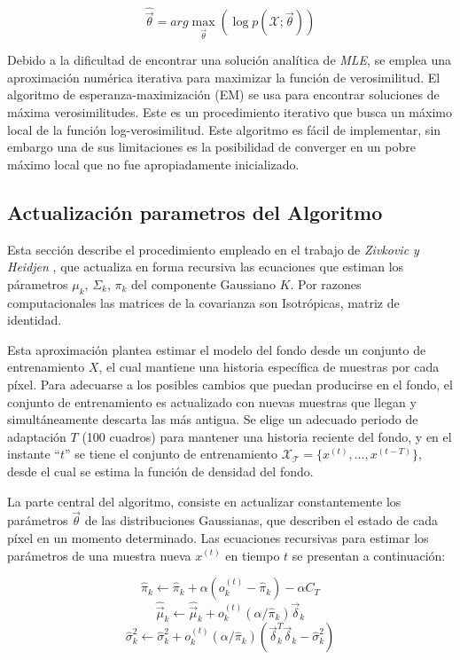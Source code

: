 \begin{equation} \label{eq:maxima_verosimilutd}
\hat{\vec{\theta}} = arg \max_{\vec{\theta}}  (\log p(\mathcal{X};\vec{\theta}))
\end{equation}

 
Debido a la dificultad de encontrar una solución analítica de \textit{MLE}, se emplea una aproximación numérica iterativa para maximizar la función de verosimilitud.  El algoritmo de esperanza-maximización (EM) \cite{dempster_maximum_1977} se usa para encontrar soluciones de máxima verosimilitudes. Este es un procedimiento iterativo que busca un máximo local de la función log-verosimilitud. Este algoritmo es fácil de implementar, sin embargo una de sus limitaciones es la posibilidad de converger en un pobre máximo local que no fue apropiadamente inicializado.


\subsection{Actualización parametros del Algoritmo}

Esta sección describe el procedimiento empleado en el trabajo de \textit{Zivkovic y Heidjen} \cite{zivkovic_efficient_2006}, que actualiza en forma recursiva las ecuaciones que estiman los párametros $\mu_k$, $\Sigma_k$, $\pi_k$ del componente Gaussiano $K$. Por razones computacionales las matrices de la covarianza son Isotrópicas, matriz de identidad.

Esta aproximación plantea estimar el modelo del fondo desde un conjunto de entrenamiento $X$, el cual mantiene una historia específica de muestras por cada píxel. Para adecuarse a los posibles cambios que puedan producirse en el fondo, el conjunto de entrenamiento es actualizado con nuevas muestras que llegan y simultáneamente descarta las más antigua. Se elige un adecuado periodo de adaptación $T$ (100 cuadros) para mantener una historia reciente del fondo, y en el instante ``$t$'' se tiene el conjunto de entrenamiento $\mathcal{X_T} = \{x^{(t)}, ..., x^{(t-T)}\}$, desde el cual se estima la función de densidad del fondo.

La parte central del algoritmo, consiste en actualizar constantemente los parámetros $\vec{\theta}$ de las distribuciones Gaussianas, que describen el estado de cada píxel en un momento determinado. Las ecuaciones recursivas para estimar los parámetros de una muestra nueva $x^{(t)}$ en tiempo $t$ se presentan a continuación:


\begin{equation} \label{eq:mixturefactor_update}
\hat{\pi}_k \leftarrow  \hat{\pi}_k + \alpha(o^{(t)}_k - \hat{\pi}_k) - \alpha C_T
\end{equation}
\begin{equation} \label{eq:mixturemu_update}
\hat{\vec{\mu}}_k \leftarrow \hat{\vec{\mu}}_k + o^{(t)}_k (\alpha/\hat{\pi}_k) \vec{\delta}_k
\end{equation}
\begin{equation} \label{eq:mixturesigma_update}
\hat{\sigma}^2_k \leftarrow \hat{\sigma}^2_k + o^{(t)}_k (\alpha/\hat{\pi}_k) (\vec{\delta}^T_k \vec{\delta}_k - \hat{\sigma}^2_k)
\end{equation}

